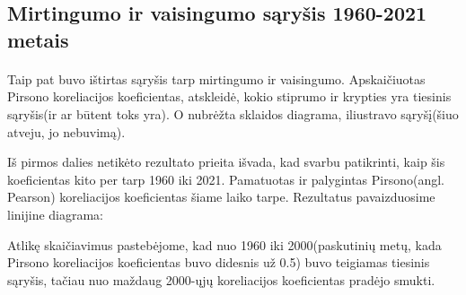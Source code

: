 \subsection{Mirtingumo ir vaisingumo sąryšis 1960-2021 metais}
\paragraph{} Taip pat buvo ištirtas sąryšis tarp mirtingumo ir vaisingumo. Apskaičiuotas Pirsono koreliacijos koeficientas, atskleidė, kokio stiprumo ir krypties yra tiesinis sąryšis(ir ar būtent toks yra). O nubrėžta sklaidos diagrama, iliustravo sąryšį(šiuo atveju, jo nebuvimą).

Iš pirmos dalies netikėto rezultato prieita išvada, kad svarbu patikrinti, kaip šis koeficientas kito per tarp 1960 iki 2021. Pamatuotas ir palygintas Pirsono(angl. Pearson) koreliacijos koeficientas šiame laiko tarpe. Rezultatus pavaizduosime linijine diagrama:

Atlikę skaičiavimus pastebėjome, kad nuo 1960 iki 2000(paskutinių metų, kada Pirsono koreliacijos koeficientas buvo didesnis už 0.5) buvo teigiamas tiesinis sąryšis, tačiau nuo maždaug 2000-ųjų koreliacijos koeficientas pradėjo smukti. 